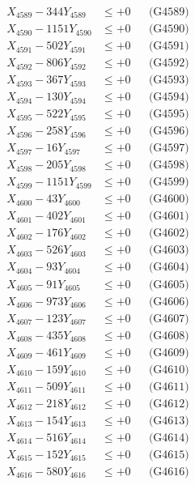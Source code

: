 \documentclass[a4paper,10pt]{article}
\begin{document}
{\begin{align}
X_{4589} - 344Y_{4589} &\leq +0 && \text{(G4589)} \\
X_{4590} - 1151Y_{4590} &\leq +0 && \text{(G4590)} \\
\allowbreak
X_{4591} - 502Y_{4591} &\leq +0 && \text{(G4591)} \\
X_{4592} - 806Y_{4592} &\leq +0 && \text{(G4592)} \\
X_{4593} - 367Y_{4593} &\leq +0 && \text{(G4593)} \\
X_{4594} - 130Y_{4594} &\leq +0 && \text{(G4594)} \\
X_{4595} - 522Y_{4595} &\leq +0 && \text{(G4595)} \\
X_{4596} - 258Y_{4596} &\leq +0 && \text{(G4596)} \\
X_{4597} - 16Y_{4597} &\leq +0 && \text{(G4597)} \\
X_{4598} - 205Y_{4598} &\leq +0 && \text{(G4598)} \\
X_{4599} - 1151Y_{4599} &\leq +0 && \text{(G4599)} \\
X_{4600} - 43Y_{4600} &\leq +0 && \text{(G4600)} \\
\allowbreak
X_{4601} - 402Y_{4601} &\leq +0 && \text{(G4601)} \\
X_{4602} - 176Y_{4602} &\leq +0 && \text{(G4602)} \\
X_{4603} - 526Y_{4603} &\leq +0 && \text{(G4603)} \\
X_{4604} - 93Y_{4604} &\leq +0 && \text{(G4604)} \\
X_{4605} - 91Y_{4605} &\leq +0 && \text{(G4605)} \\
X_{4606} - 973Y_{4606} &\leq +0 && \text{(G4606)} \\
X_{4607} - 123Y_{4607} &\leq +0 && \text{(G4607)} \\
X_{4608} - 435Y_{4608} &\leq +0 && \text{(G4608)} \\
X_{4609} - 461Y_{4609} &\leq +0 && \text{(G4609)} \\
X_{4610} - 159Y_{4610} &\leq +0 && \text{(G4610)} \\
\allowbreak
X_{4611} - 509Y_{4611} &\leq +0 && \text{(G4611)} \\
X_{4612} - 218Y_{4612} &\leq +0 && \text{(G4612)} \\
X_{4613} - 154Y_{4613} &\leq +0 && \text{(G4613)} \\
X_{4614} - 516Y_{4614} &\leq +0 && \text{(G4614)} \\
X_{4615} - 152Y_{4615} &\leq +0 && \text{(G4615)} \\
X_{4616} - 580Y_{4616} &\leq +0 && \text{(G4616)} \\

\end{align}}
\end{document}
